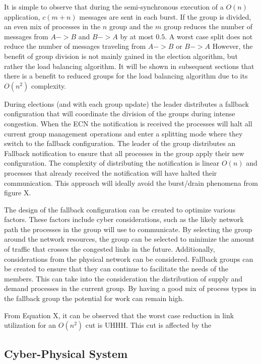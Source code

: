 It is simple to observe that during the semi-synchronous execution of a $O(n)$ application, $c(m+n)$ messages are sent in each burst.
If the group is divided, an even mix of processes in the $n$ group and the $m$ group reduces the number of messages from $A->B$ and $B->A$ by at most $0.5$.
A worst case split does not reduce the number of messages traveling from $A->B$ or $B->A$
However, the benefit of group division is not mainly gained in the election algorithm, but rather the load balancing algorithm.
It will be shown in subsequent sections that there is a benefit to reduced groups for the load balancing algorithm due to its $O(n^2)$ complexity.

During elections (and with each group update) the leader distributes a fallback configuration that will coordinate the division of the groups during intense congestion.
When the \ac{ECN} the notification is received the processes will halt all current group management operations and enter a splitting mode where they switch to the fallback configuration.
The leader of the group distributes an Fallback notification to ensure that all processes in the group apply their new configuration. 
The complexity of distributing the notification is linear $O(n)$ and processes that already received the notification will have halted their communication.
This approach will ideally avoid the burst/drain phenomena from figure X.

The design of the fallback configuration can be created to optimize various factors.
These factors include cyber considerations, such as the likely network path the processes in the group will use to communicate.
By selecting the group around the network resources, the group can be selected to minimize the amount of traffic that crosses the congested links in the future.
Additionally, considerations from the physical network can be considered.
Fallback groups can be created to ensure that they can continue to facilitate the needs of the members.
This can take into the consideration the distribution of supply and demand processes in the current group.
By having a good mix of process types in the fallback group the potential for work can remain high.

From Equation X, it can be observed that the worst case reduction in link utilization for an $O(n^2)$ cut is UHHH.
This cut is affected by the

\subsection{Cyber-Physical System}

